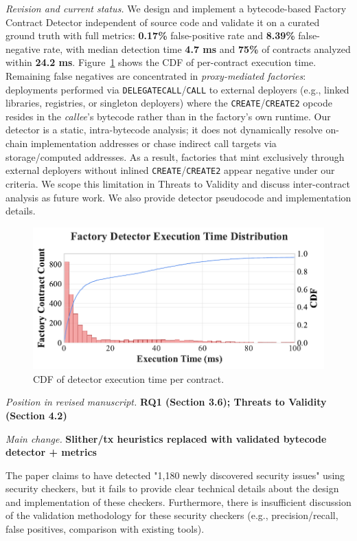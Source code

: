 \documentclass[acmsmall]{acmart}
\begin{document}
	\textit{Revision and current status.} We design and implement a bytecode-based Factory Contract Detector
	independent of source code and validate it on a curated ground truth with full metrics: \textbf{0.17\%}
	false-positive rate and \textbf{8.39\%} false-negative rate, with median detection time \textbf{4.7
	ms} and \textbf{75\%} of contracts analyzed within \textbf{24.2 ms}. Figure~\ref{fig:detector_latency_cdf}
	shows the CDF of per-contract execution time. Remaining false negatives are concentrated in
	\emph{proxy-mediated factories}: deployments performed via \texttt{DELEGATECALL}/\texttt{CALL}
	to external deployers (e.g., linked libraries, registries, or singleton deployers) where the
	\texttt{CREATE}/\texttt{CREATE2} opcode resides in the \emph{callee}'s bytecode rather than in the
	factory's own runtime. Our detector is a static, intra-bytecode analysis; it does not
	dynamically resolve on-chain implementation addresses or chase indirect call targets via storage/computed
	addresses. As a result, factories that mint exclusively through external deployers without
	inlined \texttt{CREATE}/\texttt{CREATE2} appear negative under our criteria. We scope this limitation
	in Threats to Validity and discuss inter-contract analysis as future work. We also provide
	detector pseudocode and implementation details.

	\begin{figure}[t]
		\centering
		\includegraphics[width=0.52\linewidth]{figure/execution_time_cdf.pdf}
		\caption{CDF of detector execution time per contract.}
		\label{fig:detector_latency_cdf}
	\end{figure}

	\textit{Position in revised manuscript.}
	{\color{red}\textbf{RQ1 (Section 3.6); Threats to Validity (Section 4.2)}}

	\textit{Main change.}
	{\color{blue}\textbf{Slither/tx heuristics replaced with validated bytecode detector + metrics}}

	\begin{tcolorbox}
		[commentbox,title=Reviewer \#3 -- Comment 5] The paper claims to have detected "1,180 newly
		discovered security issues" using security checkers, but it fails to provide clear technical
		details about the design and implementation of these checkers. Furthermore, there is
		insufficient discussion of the validation methodology for these security checkers (e.g., precision/recall,
		false positives, comparison with existing tools).
	\end{tcolorbox}
\end{document}
